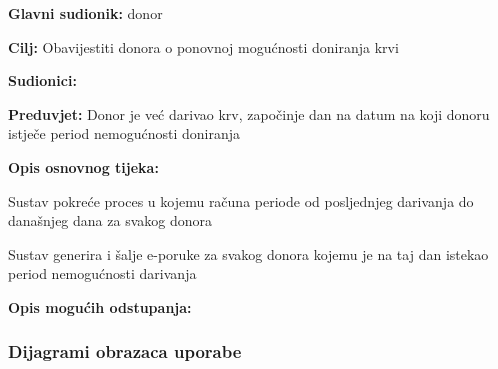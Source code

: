 					
					\noindent {}
					\begin{packed_item}
	
						\item \textbf{Glavni sudionik: }donor
						\item  \textbf{Cilj:} Obavijestiti donora o ponovnoj mogućnosti doniranja krvi
						\item  \textbf{Sudionici:} 
						\item  \textbf{Preduvjet:} Donor je već darivao krv, započinje dan na datum na koji donoru istječe period nemogućnosti doniranja
						\item  \textbf{Opis osnovnog tijeka:}
						
						\item[] \begin{packed_enum}
							\item Sustav pokreće proces u kojemu računa periode od posljednjeg darivanja do današnjeg dana za svakog donora
	                        \item Sustav generira i šalje e-poruke za svakog donora kojemu je na taj dan istekao period nemogućnosti darivanja
						\end{packed_enum}
						
						\item  \textbf{Opis mogućih odstupanja:}
						
					\end{packed_item}
					
				\subsubsection{Dijagrami obrazaca uporabe}
					
				
